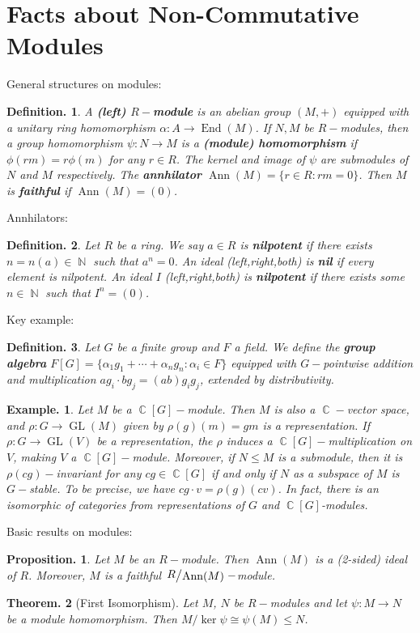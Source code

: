 \documentclass[11pt, a4paper]{memoir}
\DeclareMathOperator{\N}{{\mathbb{N}}}
\DeclareMathOperator{\C}{{\mathbb{C}}}
\newcommand{\mbf}[1]{{\boldmath\bfseries #1}}
\theoremstyle{change}
\newtheorem{theorem}{Theorem.}[section]
\newtheorem{proposition}[theorem]{Proposition.}
\theoremstyle{plain}
\theoremstyle{nonumberplain}
\newtheorem{definition}{Definition.}
\newtheorem{example}{Example.}
\DeclareMathOperator{\Ann}{Ann}
\DeclareMathOperator{\End}{End}
\DeclareMathOperator{\GL}{GL}
\newcommand{\quot}[2]{\mathchoice{\left.\raisebox{0.14em}{$#1$}\middle/\raisebox{-0.14em}{$#2$}\right.}
                                 {\left.\raisebox{0.08em}{$#1$}\middle/\raisebox{-0.08em}{$#2$}\right.}
                                 {\left.\raisebox{0.03em}{$#1$}\middle/\raisebox{-0.03em}{$#2$}\right.}
                                 {\left.\raisebox{0em}{$#1$}\middle/\raisebox{0em}{$#2$}\right.}}
\numberwithin{equation}{section}
\begin{document}
\section{Facts about Non-Commutative Modules}
General structures on modules:
\begin{definition}
    A \mbf{(left) $R-$module} is an abelian group $(M,+)$ equipped with a unitary ring homomorphism $\alpha:A\to\End(M)$.
    If $N,M$ be $R-$modules, then a group homomorphism $\psi:N\to M$ is a \textbf{(module) homomorphism} if $\phi(rm)=r\phi(m)$ for any $r\in R$.
    The kernel and image of $\psi$ are submodules of $N$ and $M$ respectively.
    The \textbf{annhilator} $\Ann(M)=\{r\in R:rm=0\}$.
    Then $M$ is \textbf{faithful} if $\Ann(M)=(0)$.
\end{definition}
Annhilators:
\begin{definition}
    Let $R$ be a ring.
    We say $a\in R$ is \textbf{nilpotent} if there exists $n=n(a)\in\N$ such that $a^n=0$.
    An ideal (left,right,both) is \textbf{nil} if every element is nilpotent.
    An ideal $I$ (left,right,both) is \textbf{nilpotent} if there exists some $n\in\N$ such that $I^n=(0)$.
\end{definition}
Key example:
\begin{definition}
    Let $G$ be a finite group and $F$ a field.
    We define the \textbf{group algebra} $F[G]=\{\alpha_1g_1+\cdots+\alpha_ng_n:\alpha_i\in F\}$ equipped with $G-$pointwise addition and multiplication $ag_i\cdot bg_j=(ab)g_ig_j$, extended by distributivity.
\end{definition}
\begin{example}
    Let $M$ be a $\C[G]-$module.
    Then $M$ is also a $\C-$vector space, and $\rho:G\to\GL(M)$ given by $\rho(g)(m)=gm$ is a representation.
    If $\rho:G\to\GL(V)$ be a representation, the $\rho$ induces a $\C[G]-$multiplication on $V$, making $V$ a $\C[G]-$module.
    Moreover, if $N\leq M$ is a submodule, then it is $\rho(cg)-$invariant for any $cg\in\C[G]$ if and only if $N$ as a subspace of $M$ is $G-$stable.
    To be precise, we have $c g\cdot v=\rho(g)(c v)$.
    In fact, there is an isomorphic of categories from representations of $G$ and $\C[G]$-modules.
\end{example}
Basic results on modules:
\begin{proposition}
    Let $M$ be an $R-$module.
    Then $\Ann(M)$ is a (2-sided) ideal of $R$.
    Moreover, $M$ is a faithful $\quot{R}{\Ann(M)}-$module.
\end{proposition}
\begin{theorem}[First Isomorphism]
    Let $M$, $N$ be $R-$modules and let $\psi:M\to N$ be a module homomorphism.
    Then $M/\ker\psi\cong\psi(M)\leq N$.
\end{theorem}
\end{document}
